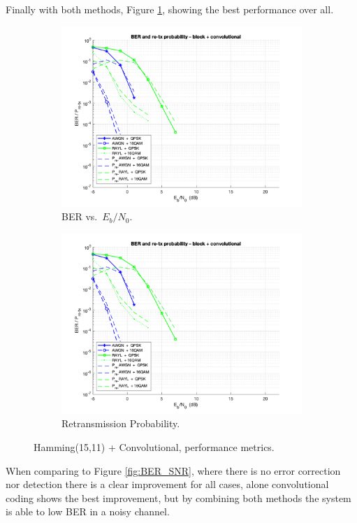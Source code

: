 Finally with both methods, Figure \ref{fig:Both_BER}, showing the best performance over all.

\begin{figure}[H]

    \centering
    \begin{subfigure}{0.45\textwidth}
        \includegraphics*[scale = 0.18]{Images/BlockConvCode.png}
        \caption{BER vs.\ $E_b/N_0$.}
        \label{fig:Both_BER}
    \end{subfigure}
    \begin{subfigure}{0.45\textwidth}
        \includegraphics*[scale = 0.19]{Images/BlockConvCode.png}
        \caption{Retransmission Probability.}
        \label{fig:Pret_Both_Sim}
    \end{subfigure}
    
    \caption{Hamming(15,11) + Convolutional, performance metrics.}
    \label{fig:Both_performance}
\end{figure}

When comparing to Figure \ref{fig:BER_SNR}, where there is no error correction nor detection there is a clear improvement for all cases, alone convolutional coding shows the best improvement, but by combining both methods the system is able to low BER in a noisy channel.